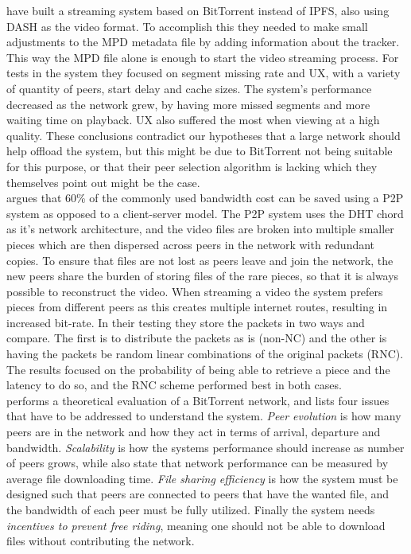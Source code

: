\citet{gazdar2017toward} have built a streaming system based on BitTorrent instead of \ac{IPFS}, also using \ac{DASH} as the video format. To accomplish this they needed to make small adjustments to the \ac{MPD} metadata file by adding information about the tracker. This way the \ac{MPD} file alone is enough to start the video streaming process. For tests in the system they focused on segment missing rate and \ac{UX}, with a variety of quantity of peers, start delay and cache sizes. The system's performance decreased as the network grew, by having more missed segments and more waiting time on playback. \ac{UX} also suffered the most when viewing at a high quality. These conclusions contradict our hypotheses that a large network should help offload the system, but this might be due to BitTorrent not being suitable for this purpose, or that their peer selection algorithm is lacking which they themselves point out might be the case.
\\


\citet{nguyen2009p2p} argues that 60\% of the commonly used bandwidth cost can be saved using a \ac{P2P} system as opposed to a client-server model. The \ac{P2P} system uses the \ac{DHT} chord as it's network architecture, and the video files are broken into multiple smaller pieces which are then dispersed across peers in the network with redundant copies. To ensure that files are not lost as peers leave and join the network, the new peers share the burden of storing files of the rare pieces, so that it is always possible to reconstruct the video. When streaming a video the system prefers pieces from different peers as this creates multiple internet routes, resulting in increased bit-rate. In their testing they store the packets in two ways and compare. The first is to distribute the packets as is (non-\ac{NC}) and the other is having the packets be random linear combinations of the original packets (\ac{RNC}). The results focused on the probability of being able to retrieve a piece and the latency to do so, and  the \ac{RNC} scheme performed best in both cases.
\\


\citet{qiu2004modeling} performs a theoretical evaluation of a BitTorrent network, and lists four issues that have to be addressed to understand the system.
\emph{Peer evolution} is how many peers are in the network and how they act in terms of arrival, departure and bandwidth.
\emph{Scalability} is how the systems performance should increase as number of peers grows, while also state that network performance can be measured by average file downloading time.
\emph{File sharing efficiency} is how the system must be designed such that peers are connected to peers that have the wanted file, and the bandwidth of each peer must be fully utilized.
Finally the system needs \emph{incentives to prevent free riding}, meaning one should not be able to download files without contributing the network.

